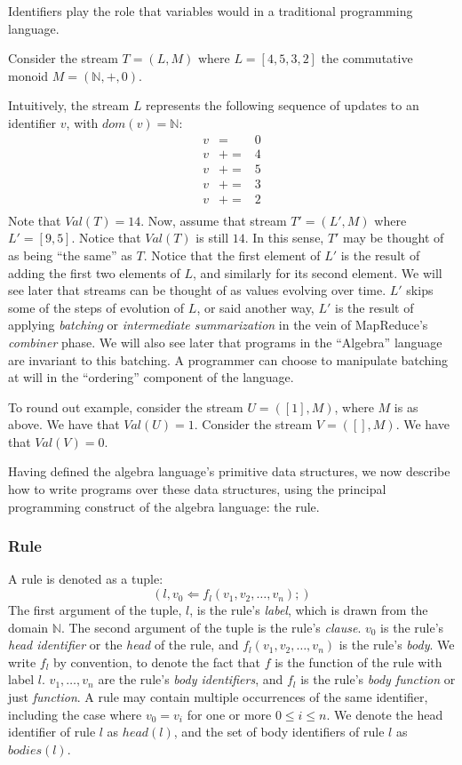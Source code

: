 Identifiers play the role that variables would in a traditional programming language.

\begin{example}
Consider the stream $T = (L,M)$ where $L = [4, 5, 3, 2]$ the commutative monoid $M = (\mathbb{N}, +, 0)$.

Intuitively, the stream $L$ represents the following sequence of updates to an identifier $v$, with $dom(v) = \mathbb{N}$:
\begin{eqnarray*}
v &=& 0\\
v &+=& 4\\
v &+=& 5\\
v &+=& 3\\
v &+=& 2\\
\end{eqnarray*}
Note that $Val(T) = 14$.  Now, assume that stream $T' = (L',M)$ where $L' = [9, 5]$.  Notice that $Val(T)$ is still $14$.  In this sense, $T'$ may be thought of as being ``the same'' as $T$.  Notice that the first element of $L'$ is the result of adding the first two elements of $L$, and similarly for its second element.  We will see later that streams can be thought of as values evolving over time.  $L'$ skips some of the steps of evolution of $L$, or said another way, $L'$ is the result of applying {\em batching} or {\em intermediate summarization} in the vein of MapReduce's {\em combiner} phase.  We will also see later that programs in the ``Algebra'' language are invariant to this batching.  A programmer can choose to manipulate batching at will in the ``ordering'' component of the language.

To round out example, consider the stream $U = ([1], M)$, where $M$ is as above.  We have that $Val(U) = 1$.  Consider the stream $V = ([], M)$.  We have that $Val(V) = 0$.
\end{example}

Having defined the algebra language's primitive data structures, we now describe how to write programs over these data structures, using the principal programming construct of the algebra language: the rule.

\subsubsection{Rule}

A rule is denoted as a tuple: $$(l, v_0 \Leftarrow f_l(v_1, v_2, \dots, v_n);)$$  The first argument of the tuple, $l$, is the rule's {\em label}, which is drawn from the domain $\mathbb{N}$.  The second argument of the tuple is the rule's {\em clause}. $v_0$ is the rule's {\em head identifier} or the {\em head} of the rule, and $f_l(v_1, v_2, \dots, v_n)$ is the rule's {\em body}.  We write $f_l$ by convention, to denote the fact that $f$ is the function of the rule with label $l$.  $v_1, \dots, v_n$ are the rule's {\em body identifiers}, and $f_l$ is the rule's {\em body function} or just {\em function}.  A rule may contain multiple occurrences of the same identifier, including the case where $v_0 = v_i$ for one or more $0 \leq i \leq n$.  We denote the head identifier of rule $l$ as $head(l)$, and the set of body identifiers of rule $l$ as $bodies(l)$.

